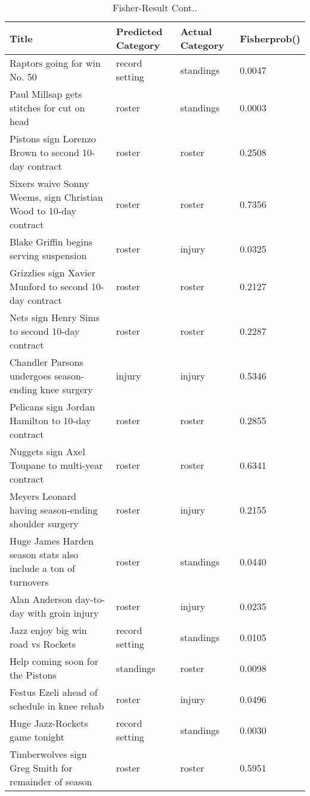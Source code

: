 \newpage
\begin{table}[!htbp]
\caption{Fisher-Result Cont..} \label{tab:fisher-result1}
\begin{center}
\scriptsize
\vspace{-5mm}
\hspace*{-20mm}
\begin{tabular}{ l l l l}
\hline
Title & Predicted Category & Actual Category & Fisherprob()\\
\hline
Raptors going for win No. 50 & record setting & standings & 0.0047\\
Paul Millsap gets stitches for cut on head & roster & standings & 0.0003\\
Pistons sign Lorenzo Brown to second 10-day contract & roster & roster & 0.2508\\
Sixers waive Sonny Weems, sign Christian Wood to 10-day contract & roster & roster & 0.7356\\
Blake Griffin begins serving suspension & roster & injury & 0.0325\\
Grizzlies sign Xavier Munford to second 10-day contract & roster & roster & 0.2127\\
Nets sign Henry Sims to second 10-day contract & roster & roster & 0.2287\\
Chandler Parsons undergoes season-ending knee surgery & injury & injury & 0.5346\\
Pelicans sign Jordan Hamilton to 10-day contract & roster & roster & 0.2855\\
Nuggets sign Axel Toupane to multi-year contract & roster & roster & 0.6341\\
Meyers Leonard having season-ending shoulder surgery & roster & injury & 0.2155\\
Huge James Harden season stats also include a ton of turnovers & roster & standings & 0.0440\\
Alan Anderson day-to-day with groin injury & roster & injury & 0.0235\\
Jazz enjoy big win road vs Rockets & record setting & standings & 0.0105\\
Help coming soon for the Pistons & standings & roster & 0.0098\\
Festus Ezeli ahead of schedule in knee rehab & roster & injury & 0.0496\\
Huge Jazz-Rockets game tonight & record setting & standings & 0.0030\\
Timberwolves sign Greg Smith for remainder of season & roster & roster & 0.5951\\

\end{tabular}
\end{center}
\end{table}
